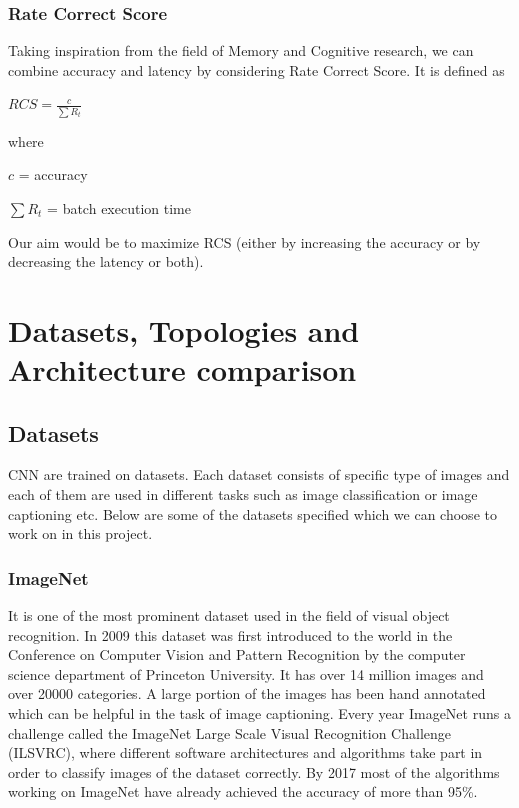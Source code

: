 \documentclass[titlepage]{report}
\begin{document}
\subsection{Rate Correct Score}
Taking inspiration from the field of Memory and Cognitive research, we can combine accuracy and latency by considering Rate Correct Score. It is defined as    

$RCS = \frac{c}{\sum R_t}$    

where   

$c$ = accuracy    

      $\sum R_t$ = batch execution time  
      
Our aim would be to maximize RCS (either by increasing the accuracy or by decreasing the latency or both).


\chapter{Datasets, Topologies and Architecture comparison}

\section{Datasets}
CNN are trained on datasets. Each dataset consists of specific type of images and each of them are used in different tasks such as image classification or image captioning etc. Below are some of the datasets specified which we can choose to work on in this project.
\subsection{ImageNet}
It is one of the most prominent dataset used in the field of visual object recognition. In 2009 this dataset was first introduced to the world in the Conference on Computer Vision and Pattern Recognition by the computer science department of  Princeton University. It has over 14 million images and over 20000 categories. A large portion of the images has been hand annotated which can be helpful in the task of image captioning. Every year ImageNet runs a challenge called the ImageNet Large Scale Visual Recognition Challenge (ILSVRC), where different software architectures and algorithms take part in order to classify images of the dataset correctly. By 2017 most of the algorithms working on ImageNet have already achieved the accuracy of more than 95\%.
\end{document}
